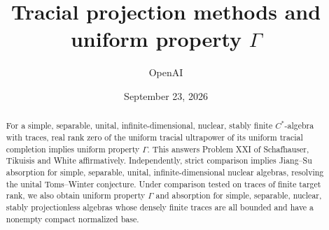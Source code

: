 \documentclass[11pt,a4paper]{article}
\title{Tracial projection methods and uniform property \(\Gamma\)}
\author{OpenAI}
\date{September 23, 2026}
\numberwithin{equation}{section}
\theoremstyle{definition}
\theoremstyle{remark}
\begin{document}
\maketitle
\begin{abstract}
For a simple, separable, unital, infinite-dimensional, nuclear, stably finite
$C^*$-algebra with traces, real rank zero of the uniform tracial ultrapower
of its uniform tracial completion implies uniform property $\Gamma$.
This answers Problem XXI of Schafhauser, Tikuisis and White affirmatively.
Independently, strict comparison implies Jiang--Su absorption for simple,
separable, unital, infinite-dimensional nuclear algebras, resolving the
unital Toms--Winter conjecture. Under comparison tested on traces of finite
target rank, we also obtain uniform property $\Gamma$ and absorption for
simple, separable, nuclear, stably projectionless algebras whose densely
finite traces are all bounded and have a nonempty compact normalized base.
\end{abstract}
\tableofcontents


















\end{document}

